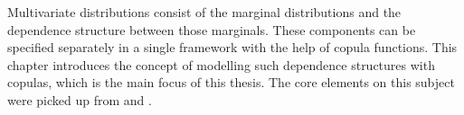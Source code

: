 
Multivariate distributions consist of the marginal distributions and the dependence structure between those marginals. These components can be specified separately in a single framework with the help of copula functions. This chapter introduces the concept of modelling such dependence structures with copulas, which is the main focus of this thesis. The core elements on this subject were picked up from \cite{mcneil2015quantitative} and \cite{Ruppert2015}.
